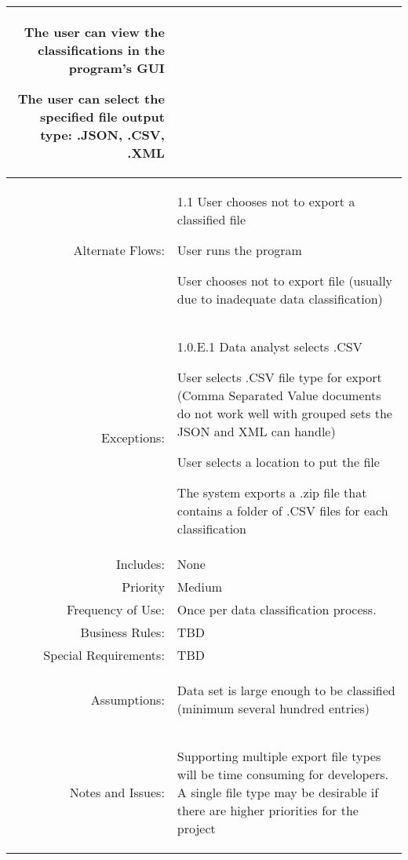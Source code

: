 \documentclass[12pt,oneside,letterpaper]{article}
\newenvironment{packed_enumerate}{ %
\vspace{-7mm}
\begin{enumerate}
  \setlength{\itemsep}{0pt}
  \setlength{\parskip}{0pt}
  \setlength{\parsep}{0pt}
}{\end{enumerate}
\vspace{-8mm}}
\begin{document}
\begin{longtable}{|r|p{3.8in}|}
\begin{packed_enumerate}
\item The user can view the classifications in the program's GUI
\item The user can select the specified file output type: .JSON, .CSV, .XML
\end{packed_enumerate}\\
\hline
Alternate Flows:&1.1 User chooses not to export a classified file\newline
\begin{packed_enumerate}
\item User runs the program
\item User chooses not to export file (usually due to inadequate data classification)
\end{packed_enumerate}\\
\hline
Exceptions:&1.0.E.1 Data analyst selects .CSV\newline
\begin{packed_enumerate}
\item User selects .CSV file type for export (Comma Separated Value documents do not work well with grouped sets the JSON and XML can handle)
\item User selects a location to put the file
\item The system exports a .zip file that contains a folder of .CSV files for each classification 
\end{packed_enumerate}\\
\hline
Includes:&None\\
\hline
Priority&Medium\\
\hline
Frequency of Use:&Once per data classification process.\\
\hline
Business Rules:&TBD\\
\hline
Special Requirements:&TBD\\
\hline
Assumptions:&\begin{packed_enumerate}
\item Data set is large enough to be classified (minimum several hundred entries)
\end{packed_enumerate}\\
\hline
Notes and Issues:&\begin{packed_enumerate}
\item Supporting multiple export file types will be time consuming for developers. A single file type may be desirable if there are higher priorities for the project
\end{packed_enumerate}\\
\hline
\end{longtable}
\end{document}
